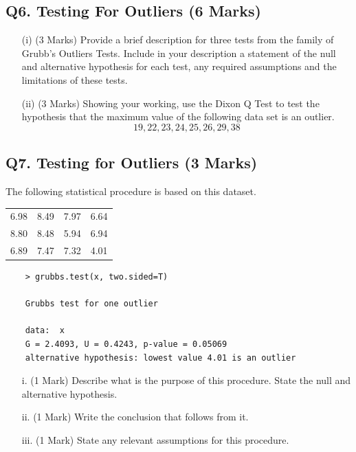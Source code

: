 \documentclass[a4paper,12pt]{article}
\begin{document}
\subsection*{Q6. Testing For Outliers (6 Marks)}
\begin{itemize}
	\item[(i)] (3 Marks) Provide a brief description for three tests from the family of Grubb's  Outliers Tests. Include in your description a statement of the null and alternative hypothesis for each test, any required assumptions and the limitations of these tests.
	\item[(ii)] (3 Marks) Showing your working, use the Dixon Q Test to test the hypothesis that the maximum value of the following data set is an outlier.
	\[ 19,22,23,24,25,26,29,38\]
\end{itemize}

\newpage
\subsection*{Q7. Testing for Outliers (3 Marks)} %
The following statistical procedure is based on this dataset.
\begin{center}
\begin{tabular}{|cccc|}
	\hline
	6.98 &8.49 &7.97& 6.64\\
	8.80 &8.48 &5.94& 6.94\\
	6.89 &7.47 &7.32& 4.01\\
	\hline
\end{tabular}
\end{center}

\begin{framed}

	\begin{verbatim}
	> grubbs.test(x, two.sided=T)
	
	Grubbs test for one outlier
	
	data:  x
	G = 2.4093, U = 0.4243, p-value = 0.05069
	alternative hypothesis: lowest value 4.01 is an outlier
	\end{verbatim}
\end{framed}

\begin{itemize}
	\item[i.] (1 Mark) Describe what is the purpose of this procedure. State the null and alternative hypothesis.
	\item[ii.] (1 Mark) Write the conclusion that follows from it.
	\item[iii.] (1 Mark) State any relevant assumptions for this procedure.
\end{itemize}
\end{document}
